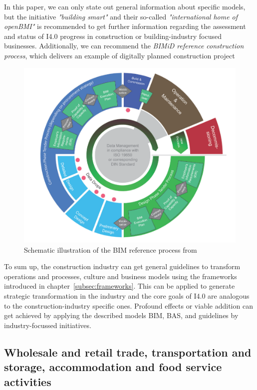 In this paper, we can only state out general information about specific models, but the initiative \emph{"building smart"} \cite{buildingsmart:2016} %
and their so-called \emph{"international home of openBMI"} is recommended to get further information regarding the assessment and status of \ac{I4.0} progress in construction or building-industry focused businesses. Additionally, we can recommend the \emph{BIMiD reference construction process}, which delivers an example of digitally planned construction project \cite{bimidReferencemodel:2016} %

\begin{figure}[H]
\centering
\includegraphics[width=1\columnwidth]{images/construction-BIM-reference-process.PNG}
\caption{Schematic illustration of the BIM reference process from \cite{FederalMinRoadMapConstruction}}
\end{figure}

To sum up, the construction industry can get general guidelines to transform operations and processes, culture and business models using the frameworks introduced in chapter~\ref{subsec:frameworks}. This can be applied to generate strategic transformation in the industry and the core goals of \ac{I4.0} are analogous to the construction-industry specific ones. Profound effects or viable addition can get achieved by applying the described models \ac{BIM}, \ac{BAS}, and guidelines by industry-focussed initiatives.

\subsection{Wholesale and retail trade, transportation and storage, accommodation and food service activities}

